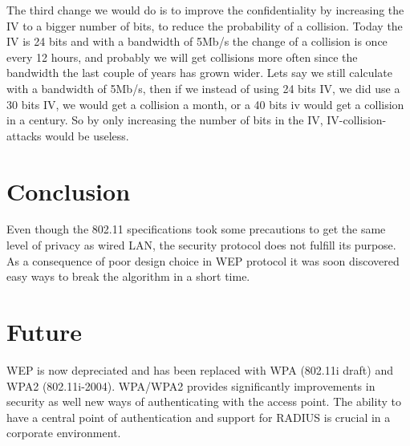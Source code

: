 \documentclass[twocolumn,11pt]{IEEEtran}
\begin{document}
The third change we would do is to improve the confidentiality by increasing the IV to a bigger number of bits, to reduce the probability of a collision. Today the IV is 24 bits and with a bandwidth of 5Mb/s the change of a collision is once every 12 hours, and probably we will get collisions more often since the bandwidth the last couple of years has grown wider. Lets say we still calculate with a bandwidth of 5Mb/s, then if we instead of using 24 bits IV, we did use a 30 bits IV, we would get a collision a month, or a 40 bits iv would get a collision in a century. So by only increasing the number of bits in the IV, IV-collision-attacks would be useless.


\section {Conclusion}
\label{sec:conclusion}

Even though the 802.11 specifications took some precautions to get the same level of privacy as wired LAN, the security protocol does not fulfill its purpose. As a consequence of poor design choice in WEP protocol it was soon discovered easy ways to break the algorithm in a short time. 


\section {Future}
\label{sec:future}

WEP is now depreciated and has been replaced with WPA (802.11i draft) and WPA2 (802.11i-2004). WPA/WPA2 provides significantly improvements in security as well new ways of authenticating with the access point. The ability to have a central point  of authentication and support for RADIUS is crucial in a corporate environment.






\end{document}
